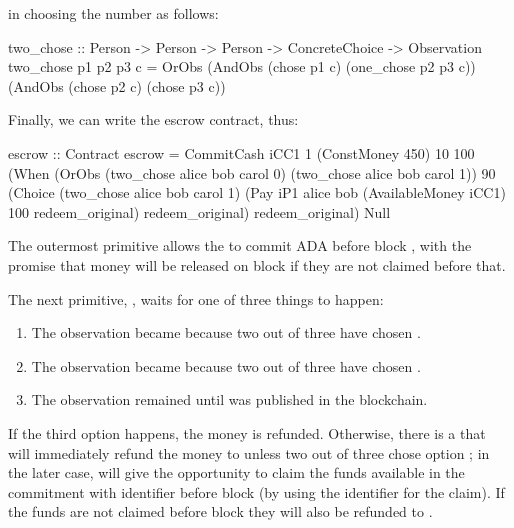 \documentclass[runningheads]{llncs}
\begin{document}
in choosing the number  as follows:
\begin{haskellcode}
two_chose :: Person -> Person -> Person -> ConcreteChoice -> Observation
two_chose p1 p2 p3 c = OrObs (AndObs (chose p1 c) (one_chose p2 p3 c))
                             (AndObs (chose p2 c) (chose p3 c))
\end{haskellcode}
Finally, we can write the escrow contract, thus:
\begin{haskellcode}
escrow :: Contract
escrow = CommitCash iCC1 1 (ConstMoney 450) 10 100
                    (When (OrObs (two_chose alice bob carol 0)
                                 (two_chose alice bob carol 1))
                          90
                          (Choice (two_chose alice bob carol 1)
                                  (Pay iP1 alice bob (AvailableMoney iCC1) 100
                                       redeem_original)
                                  redeem_original)
                          redeem_original)
                    Null
\end{haskellcode}

The outermost primitive  allows the  to commit 
 ADA before block , with the promise that money will be released on block 
 if they are not claimed before that.

The next primitive, , waits for one of three things to happen:
\begin{enumerate}
	\item The observation became  because two out of three have chosen . 
	\item The observation became  because two out of three have chosen .
	\item The observation remained  until  was published in the blockchain.
\end{enumerate}

If the third option happens, the money is refunded. Otherwise, there is a  that will 
immediately refund the money to  unless two out of three chose option 
; 
in the later case,  will give  the opportunity to claim the funds 
available in the commitment with identifier  before block  (by using the 
identifier  for the claim). If the funds are not claimed before block  they will 
also be refunded to .
\end{document}
